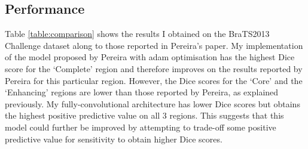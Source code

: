 \documentclass[12pt,a4paper,twoside,openright]{report}
\begin{document}
\subsection{Performance}
Table \ref{table:comparison} shows the results I obtained on the BraTS2013 Challenge dataset along to those reported in Pereira's paper. My implementation of the model proposed by Pereira with adam optimisation has the highest Dice score for the `Complete' region and therefore improves on the results reported by Pereira for this particular region. However, the Dice scores for the `Core' and the `Enhancing' regions are lower than those reported by Pereira, as explained previously. My fully-convolutional architecture has lower Dice scores but obtains the highest positive predictive value on all 3 regions. This suggests that this model could further be improved by attempting to trade-off some positive predictive value for sensitivity to obtain higher Dice scores. 

\begin{table}[h]
\centering	
{}
\caption{Comparison of model performances on the Brats2013 Challenge dataset.}
\label{table:comparison}
\end{table}
\end{document}
